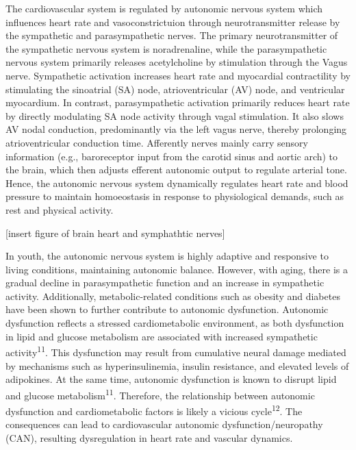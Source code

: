 \documentclass[
  a4paper,
  headsepline=true,
  open=any]{scrbook}
\begin{document}
The cardiovascular system is regulated by autonomic nervous system which
influences heart rate and vasoconstrictuion through neurotransmitter
release by the sympathetic and parasympathetic nerves. The primary
neurotransmitter of the sympathetic nervous system is noradrenaline,
while the parasympathetic nervous system primarily releases
acetylcholine by stimulation through the Vagus nerve. Sympathetic
activation increases heart rate and myocardial contractility by
stimulating the sinoatrial (SA) node, atrioventricular (AV) node, and
ventricular myocardium. In contrast, parasympathetic activation
primarily reduces heart rate by directly modulating SA node activity
through vagal stimulation. It also slows AV nodal conduction,
predominantly via the left vagus nerve, thereby prolonging
atrioventricular conduction time. Afferently nerves mainly carry sensory
information (e.g., baroreceptor input from the carotid sinus and aortic
arch) to the brain, which then adjusts efferent autonomic output to
regulate arterial tone. Hence, the autonomic nervous system dynamically
regulates heart rate and blood pressure to maintain homoeostasis in
response to physiological demands, such as rest and physical activity.

{[}insert figure of brain heart and symphathtic nerves{]}

In youth, the autonomic nervous system is highly adaptive and responsive
to living conditions, maintaining autonomic balance. However, with
aging, there is a gradual decline in parasympathetic function and an
increase in sympathetic activity. Additionally, metabolic-related
conditions such as obesity and diabetes have been shown to further
contribute to autonomic dysfunction. Autonomic dysfunction reflects a
stressed cardiometabolic environment, as both dysfunction in lipid and
glucose metabolism are associated with increased sympathetic
activity\textsuperscript{11}. This dysfunction may result from
cumulative neural damage mediated by mechanisms such as
hyperinsulinemia, insulin resistance, and elevated levels of adipokines.
At the same time, autonomic dysfunction is known to disrupt lipid and
glucose metabolism\textsuperscript{11}. Therefore, the relationship
between autonomic dysfunction and cardiometabolic factors is likely a
vicious cycle\textsuperscript{12}. The consequences can lead to
cardiovascular autonomic dysfunction/neuropathy (CAN), resulting
dysregulation in heart rate and vascular dynamics.
\end{document}
